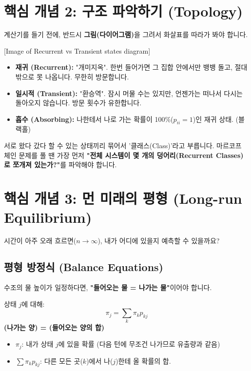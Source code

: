 \documentclass[11pt,a4paper]{book}
\theoremstyle{definition}
\begin{document}
\begin{warningbox}[title={기하 분포와 지수 분포의 관계}]
\section{핵심 개념 2: 구조 파악하기 (Topology)}

계산기를 들기 전에, 반드시 \textbf{그림(다이어그램)}을 그려서 화살표를 따라가 봐야 합니다.

[Image of Recurrent vs Transient states diagram]

\begin{itemize}
    \item \textbf{재귀 (Recurrent):} "개미지옥". 한번 들어가면 그 집합 안에서만 뱅뱅 돌고, 절대 밖으로 못 나옵니다. 무한히 방문합니다.
    \item \textbf{일시적 (Transient):} "환승역". 잠시 머물 수는 있지만, 언젠가는 떠나서 다시는 돌아오지 않습니다. 방문 횟수가 유한합니다.
    \item \textbf{흡수 (Absorbing):} 나한테서 나로 가는 확률이 100\%($p_{ii}=1$)인 재귀 상태. (블랙홀)
\end{itemize}

\begin{warningbox}[title={접근 가능성(Accessibility) 체크}]
서로 왔다 갔다 할 수 있는 상태끼리 묶어서 '클래스(Class)'라고 부릅니다.
마르코프 체인 문제를 풀 땐 가장 먼저 \textbf{"전체 시스템이 몇 개의 덩어리(Recurrent Classes)로 쪼개져 있는가?"}를 파악해야 합니다.
\end{warningbox}

\section{핵심 개념 3: 먼 미래의 평형 (Long-run Equilibrium)}

시간이 아주 오래 흐르면($n \to \infty$), 내가 어디에 있을지 예측할 수 있을까요?

\subsection{평형 방정식 (Balance Equations)}
수조의 물 높이가 일정하다면, \textbf{"들어오는 물 = 나가는 물"}이어야 합니다.

\begin{conceptbox}[title={Global Balance Equation}]
상태 $j$에 대해:
\[ \pi_j = \sum_{k} \pi_k p_{kj} \]
\textbf{(나가는 양) = (들어오는 양의 합)}
\begin{itemize}
    \item $\pi_j$: 내가 상태 $j$에 있을 확률 (다음 턴에 무조건 나가므로 유출량과 같음)
    \item $\sum \pi_k p_{kj}$: 다른 모든 곳($k$)에서 나($j$)한테 올 확률의 합.
\end{itemize}
\end{conceptbox}


\end{warningbox}
\end{document}
